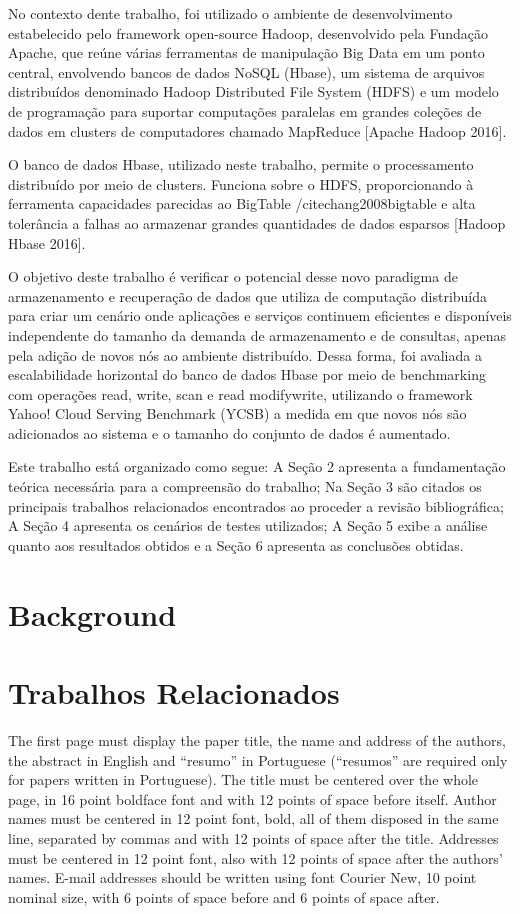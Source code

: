 \documentclass[12pt]{article}
\begin{document}
No contexto dente trabalho, foi utilizado o ambiente de desenvolvimento estabelecido pelo framework open-source Hadoop, desenvolvido pela Fundação Apache, que reúne várias ferramentas de manipulação Big Data em um ponto central, envolvendo bancos de dados NoSQL (Hbase), um sistema de arquivos distribuídos denominado Hadoop Distributed File System (HDFS) e um modelo de programação para suportar computações paralelas em grandes coleções de dados em clusters de computadores chamado MapReduce [Apache Hadoop 2016].

O banco de dados Hbase, utilizado neste trabalho, permite o processamento distribuído por meio de clusters. Funciona sobre o HDFS, proporcionando à ferramenta capacidades parecidas ao BigTable /citechang2008bigtable e alta tolerância a falhas ao armazenar grandes quantidades de dados esparsos [Hadoop Hbase 2016].

O objetivo deste trabalho é verificar o potencial desse novo paradigma de armazenamento e recuperação de dados que utiliza de computação distribuída para criar um cenário onde aplicações e serviços continuem eficientes e disponíveis independente do tamanho da demanda de armazenamento e de consultas, apenas pela adição de novos nós ao ambiente distribuído. Dessa forma, foi avaliada a escalabilidade horizontal do banco de dados Hbase por meio de benchmarking com operações read, write, scan e read modifywrite, utilizando o framework Yahoo! Cloud Serving Benchmark (YCSB) a medida em que novos nós são adicionados ao sistema e o tamanho do conjunto de dados é aumentado.

Este trabalho está organizado como segue: A Seção 2 apresenta a fundamentação teórica necessária para a compreensão do trabalho; Na Seção 3 são citados os principais trabalhos relacionados encontrados ao proceder a revisão bibliográfica; A Seção 4 apresenta os cenários de testes utilizados; A Seção 5 exibe a análise quanto aos resultados obtidos e a Seção 6 apresenta as conclusões obtidas.

\section{Background}
\label{sec:background}

\section{Trabalhos Relacionados} 
\label{section:relacionados}

The first page must display the paper title, the name and address of the
authors, the abstract in English and ``resumo'' in Portuguese (``resumos'' are
required only for papers written in Portuguese). The title must be centered
over the whole page, in 16 point boldface font and with 12 points of space
before itself. Author names must be centered in 12 point font, bold, all of
them disposed in the same line, separated by commas and with 12 points of
space after the title. Addresses must be centered in 12 point font, also with
12 points of space after the authors' names. E-mail addresses should be
written using font Courier New, 10 point nominal size, with 6 points of space
before and 6 points of space after.
\end{document}
